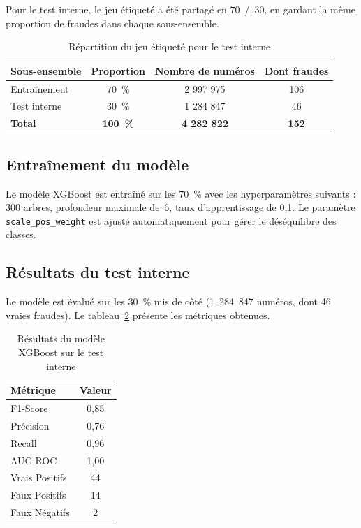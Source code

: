 \documentclass[12pt, oneside, a4paper]{report}
\begin{document}
Pour le test interne, le jeu étiqueté a été partagé en 70~/~30, en gardant la même proportion de fraudes dans chaque sous-ensemble.

\begin{table}[H]
\centering
\caption{Répartition du jeu étiqueté pour le test interne}
\label{tab:split-train-test}
\vspace{0.3cm}
\renewcommand{\arraystretch}{1.3}
\begin{tabular}{|l|c|c|c|}
\hline
\textbf{Sous-ensemble} & \textbf{Proportion} & \textbf{Nombre de numéros} & \textbf{Dont fraudes} \\
\hline
Entraînement & 70~\% & 2 997 975 & 106 \\
\hline
Test interne & 30~\% & 1 284 847 & 46 \\
\hline
\textbf{Total} & \textbf{100~\%} & \textbf{4 282 822} & \textbf{152} \\
\hline
\end{tabular}
\end{table}

\subsection{Entraînement du modèle}
Le modèle XGBoost est entraîné sur les 70~\% avec les hyperparamètres suivants : 300 arbres, profondeur maximale de~6, taux d'apprentissage de 0,1. Le paramètre \texttt{scale\_pos\_weight} est ajusté automatiquement pour gérer le déséquilibre des classes.

\subsection{Résultats du test interne}
Le modèle est évalué sur les 30~\% mis de côté (1~284~847 numéros, dont 46 vraies fraudes). Le tableau~\ref{tab:resultats-ml} présente les métriques obtenues.

\begin{table}[H]
\centering
\caption{Résultats du modèle XGBoost sur le test interne}
\label{tab:resultats-ml}
\vspace{0.3cm}
\renewcommand{\arraystretch}{1.3}
\begin{tabular}{|l|c|}
\hline
\textbf{Métrique} & \textbf{Valeur} \\
\hline
F1-Score & 0,85 \\
\hline
Précision & 0,76 \\
\hline
Recall & 0,96 \\
\hline
AUC-ROC & 1,00 \\
\hline
Vrais Positifs & 44 \\
\hline
Faux Positifs & 14 \\
\hline
Faux Négatifs & 2 \\
\hline
\end{tabular}
\end{table}
\end{document}
